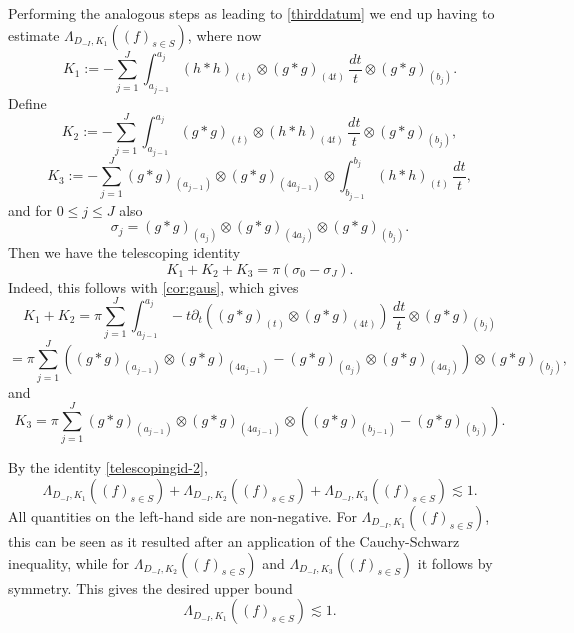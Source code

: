 \documentclass[12pt,reqno]{amsart}
\theoremstyle{plain}
\theoremstyle{definition}
\numberwithin{equation}{section}
\begin{document}
Performing the analogous steps as  leading to \eqref{thirddatum} we end up having to estimate  
$\Lambda_{D_{-I}, K_1}((f)_{s\in S})$,  
where now
\[K_1 := -\sum_{j=1}^J \int_{{a_{j-1}}}^{{a_{j}}} ( h*h)_{(t)}\otimes 
    ( g* g)_{(4 t)}\,\frac{dt}{t}  \otimes (  g* g)_{(b_j)}  . \]
Define 
\[K_2 := -\sum_{j=1}^J \int_{{a_{j-1}}}^{{a_{j}}} ( g*g)_{( t)}\otimes 
    ( h* h)_{(4 t)}\, \frac{dt}{t} \otimes (  g * g)_{(b_j)} ,  \]
    \[K_3 := -\sum_{j=1}^J  (g*g)_{({a_{j-1}})} \otimes  (g *g )_{(4 {a_{j-1}})} \otimes  \int_{b_{j-1}}^{b_j} (h*h)_{(t)} \,  \frac{dt}{t},\]
and for $0\leq j \leq J$ also 
\[\sigma_j = (g*g)_{({a_{j}})} \otimes (g*g)_{(4 {a_{j}})}\otimes (g*g)_{(b_j)} . \]
Then we have the telescoping identity
\begin{equation}
    \label{telescopingid-2}
   K_1 + K_2 +  K_3 = \pi (\sigma_0 - \sigma_J).
\end{equation}
Indeed, this follows with \eqref{cor:gaus}, which gives
\[ K_1 + K_2 =  \pi \sum_{j=1}^J \int_{{a_{j-1}}}^{{a_{j}}} -t\partial_t((g*g)_{( t)}\otimes (g* g)_{(4 t)}    )   \, \frac{dt}{t} \otimes    (g  * g)_{(b_j)}\]
\begin{equation*}
  =    \pi \sum_{j=1}^J  ((g*g)_{ {(a_{j-1})}}\otimes (g* g)_{(4 {a_{j-1}})}  - (g*g)_{ ({a_{j}})}\otimes (g* g)_{(4{a_{j}})} ) \otimes    (g  * g)_{(b_j)}, 
\end{equation*}
and 
\[K_3 = \pi \sum_{j=1}^J (g*g)_{ ({a_{j-1}})} \otimes (g*g)_{(4 {a_{j-1}})}  \otimes ((g*g)_{(b_{j-1})} - (g*g)_{(b_j)}). \]
 
 By the   identity \eqref{telescopingid-2}, 
 \[\Lambda_{D_{-I}, K_1}((f)_{s\in S}) + \Lambda_{D_{-I}, K_2}((f)_{s\in S}) + \Lambda_{D_{-I}, K_3}((f)_{s\in S}) \lesssim 1. \]
 All quantities on the left-hand side are non-negative. 
For $\Lambda_{D_{-I}, K_1}((f)_{s\in S})$, this can be seen as it resulted after an application  of the Cauchy-Schwarz inequality, while for  $\Lambda_{D_{-I}, K_2}((f)_{s\in S})$ and $\Lambda_{D_{-I}, K_3}((f)_{s\in S})$ it follows by symmetry. This gives the desired upper bound
$$\Lambda_{D_{-I}, K_1}((f)_{s\in S}) \lesssim 1. $$


{}

\end{document}
